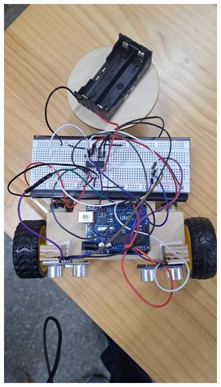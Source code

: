 \documentclass[a4paper,12pt]{article}
\begin{document}
\begin{center}
\begin{figure}[H]
\begin{minipage}[t]{0.45\textwidth}
\includegraphics[width=\textwidth]{./photos/d.jpg}
\end{minipage}
\hfill
\end{figure}\FloatBarrier\end{center}
\end{document}
